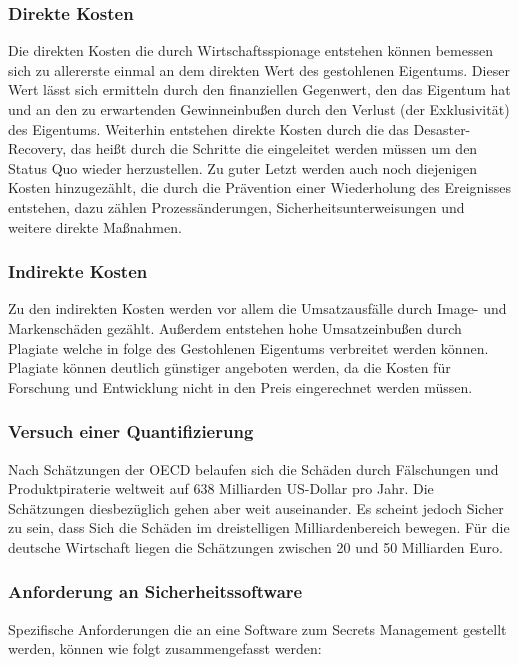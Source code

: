 \documentclass[
a4paper,   
titlepage,  
halfparskip,
12pt        
]{scrartcl}
\begin{document}
\begin{onehalfspacing}
\subsubsection{Direkte Kosten}
Die direkten Kosten die durch Wirtschaftsspionage entstehen können bemessen sich zu allererste einmal an dem direkten Wert des gestohlenen Eigentums. Dieser Wert lässt sich ermitteln durch den finanziellen Gegenwert, den das Eigentum hat und an den zu erwartenden Gewinneinbußen durch den Verlust (der Exklusivität) des Eigentums. Weiterhin entstehen direkte Kosten durch die das Desaster-Recovery, das heißt durch die Schritte die eingeleitet werden müssen um den Status Quo wieder herzustellen. Zu guter Letzt werden auch noch diejenigen Kosten hinzugezählt, die durch die Prävention einer Wiederholung des Ereignisses entstehen, dazu zählen Prozessänderungen, Sicherheitsunterweisungen und weitere direkte Maßnahmen.\cite[S. 13]{kosten}
\subsubsection{Indirekte Kosten}
Zu den indirekten Kosten werden vor allem die Umsatzausfälle durch Image- und Markenschäden gezählt. Außerdem entstehen hohe Umsatzeinbußen durch Plagiate welche in folge des Gestohlenen Eigentums verbreitet werden können. Plagiate können deutlich günstiger angeboten werden, da die Kosten für Forschung und Entwicklung nicht in den Preis eingerechnet werden müssen.\cite[S. 14]{kosten}
\subsubsection{Versuch einer Quantifizierung}
Nach Schätzungen der \ac{OECD} belaufen sich die Schäden durch Fälschungen und Produktpiraterie weltweit auf 638 Milliarden US-Dollar pro Jahr. Die Schätzungen diesbezüglich gehen aber weit auseinander. Es scheint jedoch Sicher zu sein, dass Sich die Schäden im dreistelligen Milliardenbereich bewegen. Für die deutsche Wirtschaft liegen die Schätzungen zwischen 20 und 50 Milliarden Euro.\cite[S. 16f]{kosten}
\subsubsection{Anforderung an Sicherheitssoftware}
\label{subsubsec:anforderung}
Spezifische Anforderungen die an eine Software zum Secrets Management gestellt werden, können wie folgt zusammengefasst werden:


\end{onehalfspacing}
\end{document}
